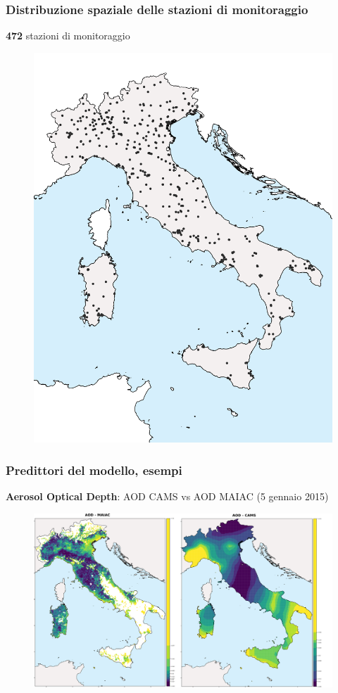 \documentclass{beamer}
\begin{document}
\begin{frame}
\frametitle{Distribuzione spaziale delle stazioni di monitoraggio}
\centerline{\textbf{472} stazioni di monitoraggio}
\begin{figure}
\includegraphics[height=0.6\textwidth]{centraline.png}
\end{figure}
\end{frame}

\begin{frame}
\frametitle{Predittori del modello, esempi}
\centerline{\textbf{Aerosol Optical Depth}: AOD CAMS vs AOD MAIAC (5 gennaio 2015)}
\begin{figure}
\includegraphics[height=0.6\textwidth]{aod_5gennaio2019.png}
\end{figure}
\end{frame}
\end{document}
